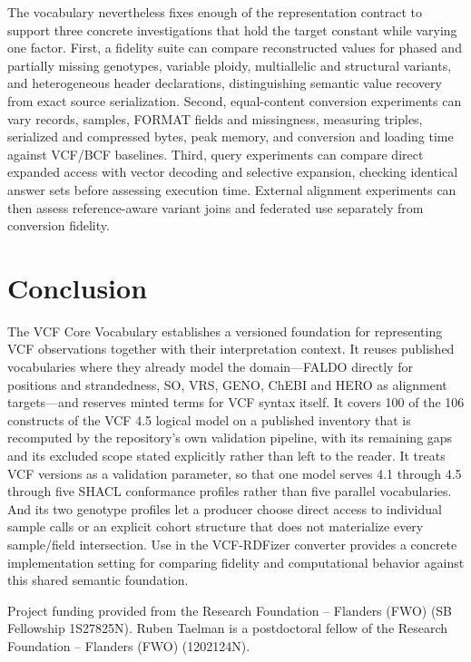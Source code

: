 \documentclass{ceurart}
\begin{document}
The vocabulary nevertheless fixes enough of the representation contract to support three concrete investigations that hold the target constant while varying one factor. First, a fidelity suite can compare reconstructed values for phased and partially missing genotypes, variable ploidy, multiallelic and structural variants, and heterogeneous header declarations, distinguishing semantic value recovery from exact source serialization. Second, equal-content conversion experiments can vary records, samples, FORMAT fields and missingness, measuring triples, serialized and compressed bytes, peak memory, and conversion and loading time against VCF/BCF baselines. Third, query experiments can compare direct expanded access with vector decoding and selective expansion, checking identical answer sets before assessing execution time. External alignment experiments can then assess reference-aware variant joins and federated use separately from conversion fidelity.

\section{Conclusion}

The VCF Core Vocabulary establishes a versioned foundation for representing VCF observations together with their interpretation context. It reuses published vocabularies where they already model the domain---FALDO directly for positions and strandedness, SO, VRS, GENO, ChEBI and HERO as alignment targets---and reserves minted terms for VCF syntax itself. It covers 100 of the 106 constructs of the VCF 4.5 logical model on a published inventory that is recomputed by the repository's own validation pipeline, with its remaining gaps and its excluded scope stated explicitly rather than left to the reader. It treats VCF versions as a validation parameter, so that one model serves 4.1 through 4.5 through five SHACL conformance profiles rather than five parallel vocabularies. And its two genotype profiles let a producer choose direct access to individual sample calls or an explicit cohort structure that does not materialize every sample/field intersection. Use in the VCF-RDFizer converter provides a concrete implementation setting for comparing fidelity and computational behavior against this shared semantic foundation.

\begin{acknowledgments}
Project funding provided from the Research Foundation -- Flanders (FWO) (SB Fellowship 1S27825N).
Ruben Taelman is a postdoctoral fellow of the Research Foundation -- Flanders (FWO) (1202124N).
\end{acknowledgments}
\end{document}
